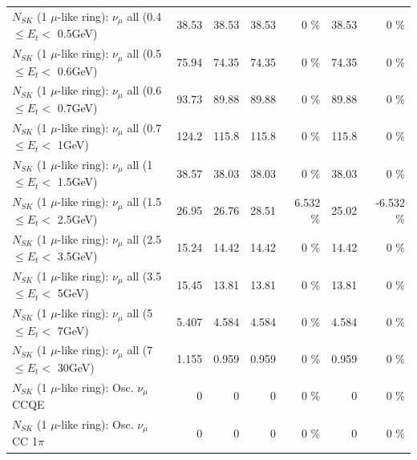 \begin{table}
\begin{tabular}{| l | r | r | r  r | r  r |}
       $N_{SK}$ (1 $\mu$-like ring): $\nu_{\mu}$ all (0.4 $\leq E_{t} <$ 0.5GeV) &           38.53 &           38.53 &           38.53 &        0 \%  &           38.53 &        0 \%  \\ 
       $N_{SK}$ (1 $\mu$-like ring): $\nu_{\mu}$ all (0.5 $\leq E_{t} <$ 0.6GeV) &           75.94 &           74.35 &           74.35 &        0 \%  &           74.35 &        0 \%  \\ 
       $N_{SK}$ (1 $\mu$-like ring): $\nu_{\mu}$ all (0.6 $\leq E_{t} <$ 0.7GeV) &           93.73 &           89.88 &           89.88 &        0 \%  &           89.88 &        0 \%  \\ 
         $N_{SK}$ (1 $\mu$-like ring): $\nu_{\mu}$ all (0.7 $\leq E_{t} <$ 1GeV) &           124.2 &           115.8 &           115.8 &        0 \%  &           115.8 &        0 \%  \\ 
         $N_{SK}$ (1 $\mu$-like ring): $\nu_{\mu}$ all (1 $\leq E_{t} <$ 1.5GeV) &           38.57 &           38.03 &           38.03 &        0 \%  &           38.03 &        0 \%  \\ 
       $N_{SK}$ (1 $\mu$-like ring): $\nu_{\mu}$ all (1.5 $\leq E_{t} <$ 2.5GeV) &           26.95 &           26.76 &           28.51 &    6.532 \%  &           25.02 &   -6.532 \%  \\ 
       $N_{SK}$ (1 $\mu$-like ring): $\nu_{\mu}$ all (2.5 $\leq E_{t} <$ 3.5GeV) &           15.24 &           14.42 &           14.42 &        0 \%  &           14.42 &        0 \%  \\ 
         $N_{SK}$ (1 $\mu$-like ring): $\nu_{\mu}$ all (3.5 $\leq E_{t} <$ 5GeV) &           15.45 &           13.81 &           13.81 &        0 \%  &           13.81 &        0 \%  \\ 
           $N_{SK}$ (1 $\mu$-like ring): $\nu_{\mu}$ all (5 $\leq E_{t} <$ 7GeV) &           5.407 &           4.584 &           4.584 &        0 \%  &           4.584 &        0 \%  \\ 
          $N_{SK}$ (1 $\mu$-like ring): $\nu_{\mu}$ all (7 $\leq E_{t} <$ 30GeV) &           1.155 &           0.959 &           0.959 &        0 \%  &           0.959 &        0 \%  \\ 
\hline
\hline
                               $N_{SK}$ (1 $\mu$-like ring): Osc. $\nu_\mu$ CCQE &               0 &               0 &               0 &        0 \%  &               0 &        0 \%  \\ 
                          $N_{SK}$ (1 $\mu$-like ring): Osc. $\nu_\mu$ CC 1$\pi$ &               0 &               0 &               0 &        0 \%  &               0 &        0 \%  \\ 

\end{tabular}
\end{table}
